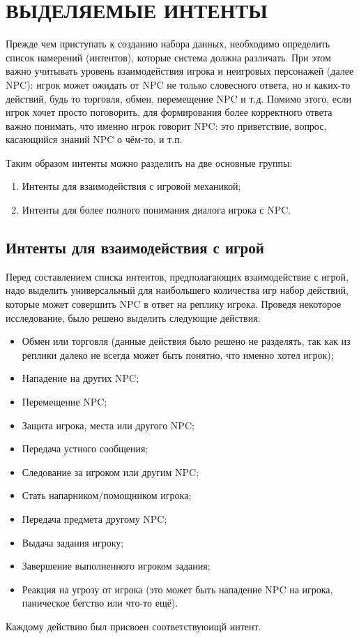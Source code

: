 \section{ВЫДЕЛЯЕМЫЕ ИНТЕНТЫ}
Прежде чем приступать к созданию набора данных, необходимо определить список намерений (интентов), которые система должна различать. 
При этом важно учитывать уровень взаимодействия игрока и неигровых персонажей (далее NPC): игрок может ожидать от NPC не только 
словесного ответа, но и каких-то действий, будь то торговля, обмен, перемещение NPC и т.д. 
Помимо этого, если игрок хочет просто поговорить, для формирования более корректного ответа важно понимать, что именно игрок говорит NPC: 
это приветствие, вопрос, касающийся знаний NPC о чём-то, и т.п.

Таким образом интенты можно разделить на две основные группы:
\begin{enumerate}
   \item Интенты для взаимодействия с игровой механикой;
   \item Интенты для более полного понимания диалога игрока с NPC.
\end{enumerate}
\subsection{Интенты для взаимодействия с игрой}
Перед составлением списка интентов, предполагающих взаимодействие с игрой, надо выделить универсальный для наибольшего количества игр
набор действий, которые может совершить NPC в ответ на реплику игрока. Проведя некоторое исследование, было решено выделить следующие действия:
\begin{itemize}
   \item Обмен или торговля (данные действия было решено не разделять, так как из реплики далеко не всегда может быть понятно, что именно хотел игрок);
   \item Нападение на других NPC;
   \item Перемещение NPC;
   \item Защита игрока, места или другого NPC;
   \item Передача устного сообщения;
   \item Следование за игроком или другим NPC;
   \item Стать напарником/помощником игрока;
   \item Передача предмета другому NPC;
   \item Выдача задания игроку;
   \item Завершение выполненного игроком задания;
   \item Реакция на угрозу от игрока (это может быть нападение NPC на игрока, паническое бегство или что-то ещё).
\end{itemize}
Каждому действию был присвоен соответствуюищй интент.
